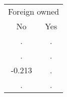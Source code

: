 \begin{tabular}{cc}
\toprule
\multicolumn{2}{c}{Foreign owned} \\
\cmidrule(lr){1-2}
No & Yes \\
\midrule
. & . \\
. & . \\
-0.213 & . \\
. & . \\
\bottomrule
\end{tabular}
